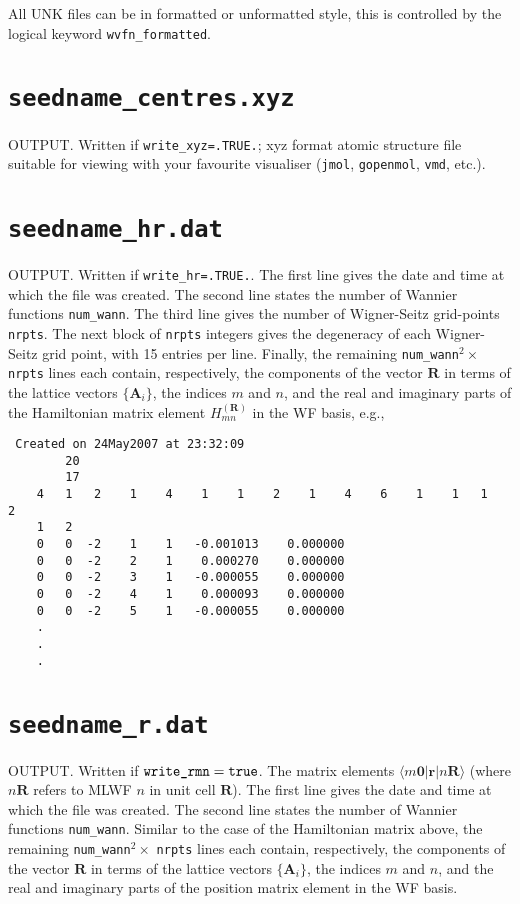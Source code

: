 All  UNK files can be in formatted or unformatted style, this is controlled
by the logical keyword \verb#wvfn_formatted#. 


\section{{\tt seedname\_centres.xyz}}

OUTPUT. Written if {\tt write\_xyz=.TRUE.}; xyz format
atomic structure file suitable for viewing with your favourite
visualiser ({\tt jmol}, {\tt gopenmol}, {\tt vmd}, etc.). 

\section{{\tt seedname\_hr.dat}}

OUTPUT. Written if {\tt write\_hr=.TRUE.}. The first line gives the date and
time at which the file was created. 
The second line states the number of Wannier functions {\tt num\_wann}. The third
line gives the number of Wigner-Seitz grid-points {\tt nrpts}. The next block of 
{\tt nrpts} integers gives the degeneracy of each Wigner-Seitz grid point, with
15 entries per line.
Finally, the remaining {\tt num\_wann}$^2 \times$ {\tt nrpts} lines
each contain, respectively, the components of the vector $\mathbf{R}$
in terms of the lattice vectors $\{\mathbf{A}_{i}\}$, the indices $m$
and $n$, and the real and imaginary parts of the Hamiltonian matrix element
$H_{mn}^{(\mathbf{R})}$ in the WF basis, e.g.,

\begin{verbatim}
 Created on 24May2007 at 23:32:09                            
        20
        17
    4   1   2    1    4    1    1    2    1    4    6    1    1   1   2
    1   2
    0   0  -2    1    1   -0.001013    0.000000
    0   0  -2    2    1    0.000270    0.000000
    0   0  -2    3    1   -0.000055    0.000000
    0   0  -2    4    1    0.000093    0.000000
    0   0  -2    5    1   -0.000055    0.000000
    .
    .
    .
\end{verbatim}

\section{{\tt seedname\_r.dat}}
OUTPUT.
Written if $\verb#write_rmn#=\verb#true#$. The matrix elements
$\langle m\mathbf{0}|\mathbf{r}|n\mathbf{R}\rangle$ (where $n\mathbf{R}$ refers to MLWF $n$ in unit cell $\mathbf{R}$). The first line gives the date and time at which the file was created. 
The second line states the number of Wannier functions {\tt num\_wann}. 
Similar to the case of the Hamiltonian matrix above, the 
remaining {\tt num\_wann}$^2 \times$ {\tt nrpts} lines
each contain, respectively, the components of the vector $\mathbf{R}$
in terms of the lattice vectors $\{\mathbf{A}_{i}\}$, the indices $m$
and $n$, and the real and imaginary parts of the position matrix element
in the WF basis.

